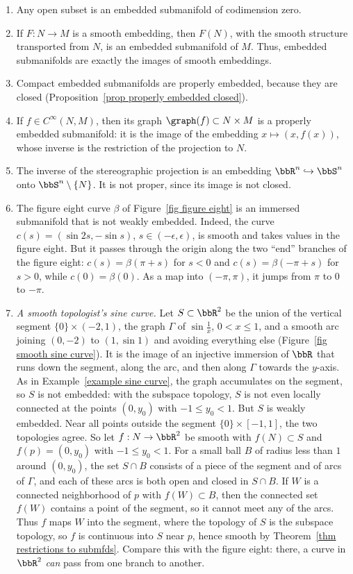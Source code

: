 \begin{example}\label{example submanifolds}
    \begin{enumerate}
        \item Any open subset is an embedded submanifold of codimension zero.
        \item If $F:N\to M$ is a smooth embedding, then $F(N)$, with the smooth structure transported from $N$, is an embedded submanifold of $M$. Thus, embedded submanifolds are exactly the images of smooth embeddings.
        \item Compact embedded submanifolds are properly embedded, because they are closed (Proposition~\ref{prop properly embedded closed}).
        \item If $f\in C^\infty(N,M)$, then its graph $\graph(f)\subset N\times M$ is a properly embedded submanifold: it is the image of the embedding $x\mapsto(x,f(x))$, whose inverse is the restriction of the projection to $N$.
        \item The inverse of the stereographic projection is an embedding $\bbR^n\hookrightarrow\bbS^n$ onto $\bbS^n\setminus\{N\}$. It is not proper, since its image is not closed.
        \item The figure eight curve $\beta$ of Figure~\ref{fig figure eight} is an immersed submanifold that is not weakly embedded. Indeed, the curve $c(s)=(\sin2s,-\sin s)$, $s\in(-\epsilon,\epsilon)$, is smooth and takes values in the figure eight. But it passes through the origin along the two ``end'' branches of the figure eight: $c(s)=\beta(\pi+s)$ for $s<0$ and $c(s)=\beta(-\pi+s)$ for $s>0$, while $c(0)=\beta(0)$. As a map into $(-\pi,\pi)$, it jumps from $\pi$ to $0$ to $-\pi$.
        \item \emph{A smooth topologist's sine curve.} Let $S\subset\bbR^2$ be the union of the vertical segment $\{0\}\times(-2,1)$, the graph $\Gamma$ of $\sin\frac1x$, $0<x\leq1$, and a smooth arc joining $(0,-2)$ to $(1,\sin1)$ and avoiding everything else (Figure~\ref{fig smooth sine curve}). It is the image of an injective immersion of $\bbR$ that runs down the segment, along the arc, and then along $\Gamma$ towards the $y$-axis. As in Example~\ref{example sine curve}, the graph accumulates on the segment, so $S$ is not embedded: with the subspace topology, $S$ is not even locally connected at the points $(0,y_0)$ with $-1\leq y_0<1$. But $S$ is weakly embedded. Near all points outside the segment $\{0\}\times[-1,1]$, the two topologies agree. So let $f:N\to\bbR^2$ be smooth with $f(N)\subset S$ and $f(p)=(0,y_0)$ with $-1\leq y_0<1$. For a small ball $B$ of radius less than $1$ around $(0,y_0)$, the set $S\cap B$ consists of a piece of the segment and of arcs of $\Gamma$, and each of these arcs is both open and closed in $S\cap B$. If $W$ is a connected neighborhood of $p$ with $f(W)\subset B$, then the connected set $f(W)$ contains a point of the segment, so it cannot meet any of the arcs. Thus $f$ maps $W$ into the segment, where the topology of $S$ is the subspace topology, so $f$ is continuous into $S$ near $p$, hence smooth by Theorem~\ref{thm restrictions to submfds}. Compare this with the figure eight: there, a curve in $\bbR^2$ \emph{can} pass from one branch to another.

\end{enumerate}
\end{example}
